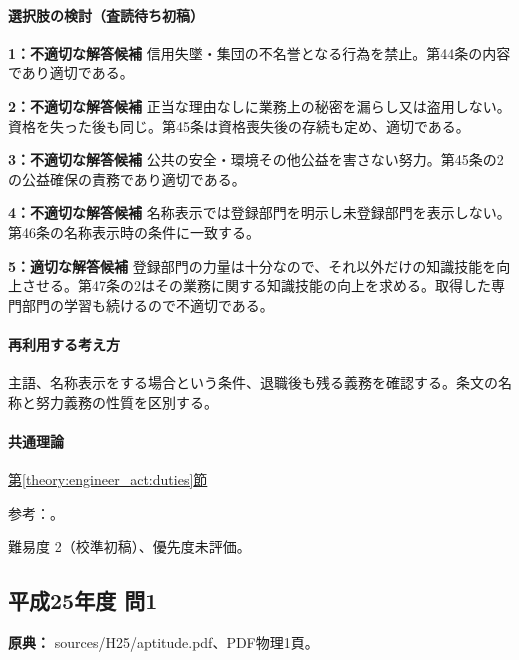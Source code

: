 \paragraph{選択肢の検討（査読待ち初稿）}\mbox{}\par

\noindent\textbf{1：不適切な解答候補} 信用失墜・集団の不名誉となる行為を禁止。第44条の内容であり適切である。\par

\noindent\textbf{2：不適切な解答候補} 正当な理由なしに業務上の秘密を漏らし又は盗用しない。資格を失った後も同じ。第45条は資格喪失後の存続も定め、適切である。\par

\noindent\textbf{3：不適切な解答候補} 公共の安全・環境その他公益を害さない努力。第45条の2の公益確保の責務であり適切である。\par

\noindent\textbf{4：不適切な解答候補} 名称表示では登録部門を明示し未登録部門を表示しない。第46条の名称表示時の条件に一致する。\par

\noindent\textbf{5：適切な解答候補} 登録部門の力量は十分なので、それ以外だけの知識技能を向上させる。第47条の2はその業務に関する知識技能の向上を求める。取得した専門部門の学習も続けるので不適切である。\par

\paragraph{再利用する考え方} 主語、名称表示をする場合という条件、退職後も残る義務を確認する。条文の名称と努力義務の性質を区別する。

\paragraph{共通理論} \hyperref[theory:engineer_act:duties]{第\ref*{theory:engineer_act:duties}節}

\par 参考：\cite{engineer_act_current}。

\par 難易度 2（校準初稿）、優先度未評価。

\subsection{平成25年度 問1}
\label{q:h25-reg-apt-01}

\noindent\textbf{原典：} sources/H25/aptitude.pdf、PDF物理1頁。


